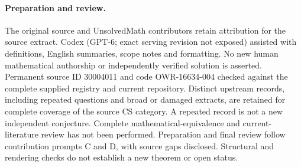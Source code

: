 \documentclass[11pt]{article}
\begin{document}
\paragraph{Preparation and review.}
The original source and UnsolvedMath contributors retain attribution for the source extract. Codex (GPT-6; exact serving revision not exposed) assisted with definitions, English summaries, scope notes and formatting. No new human mathematical authorship or independently verified solution is asserted. Permanent source ID 30004011 and code OWR-16634-004 checked against the complete supplied registry and current repository. Distinct upstream records, including repeated questions and broad or damaged extracts, are retained for complete coverage of the source CS category. A repeated record is not a new independent conjecture. Complete mathematical-equivalence and current-literature review has not been performed. Preparation and final review follow contribution prompts C and D, with source gaps disclosed. Structural and rendering checks do not establish a new theorem or open status.
\label{end:30004011}
\end{document}
